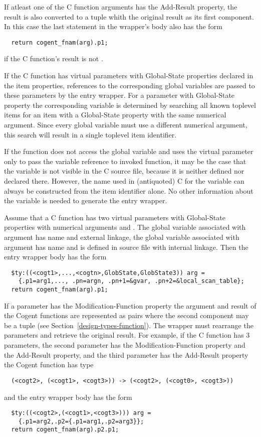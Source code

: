 If atleast one of the C function arguments has the Add-Result property, the result is also converted to a tuple 
whith the original result as its first component. In this case the last statement in the wrapper's body also 
has the form
\begin{verbatim}
  return cogent_fnam(arg).p1;
\end{verbatim}
if the C function's result is not .

If the C function has virtual parameters with Global-State properties declared in the item properties, references
to the corresponding global variables are passed to these parameters by the entry wrapper. For a parameter with 
Global-State property the corresponding variable is determined by searching all known toplevel items for an
item with a Global-State property with the same numerical argument. Since every global variable must use a 
different numerical argument, this search will result in a single toplevel item identifier. 

If the function does not access the global variable and uses the virtual parameter only to pass the variable 
reference to invoked function, it may be the case that the variable is not visible in the C source file, because
it is neither defined nor declared there. However, the name used in (antiquoted) C for the variable can always 
be constructed from the item identifier alone. No other information about the variable is needed to generate the 
entry wrapper.

Assume that a C function has two virtual parameters with Global-State properties with numerical arguments 
 and . The global variable associated with argument  has name  and external linkage,
the global variable associated with argument  has name  and is defined in source file 
with internal linkage. Then the entry wrapper body has the form
\begin{verbatim}
  $ty:((<cogt1>,...,<cogtn>,GlobState,GlobState3)) arg = 
    {.p1=arg1,..., .pn=argn, .pn+1=&gvar, .pn+2=&local_scan_table};
  return cogent_fnam(arg).p1;
\end{verbatim}


If a parameter has the Modification-Function property the argument and result of the Cogent functions are
represented as pairs where the second component may be a tuple (see Section~\ref{design-types-function}). 
The wrapper must rearrange the parameters and retrieve the original result. For example, if the C 
function has 3 parameters, the second parameter has the Modification-Function property and the Add-Result 
property, and the third parameter has the Add-Result property the Cogent function has type
\begin{verbatim}
  (<cogt2>, (<cogt1>, <cogt3>)) -> (<cogt2>, (<cogt0>, <cogt3>))
\end{verbatim}
and the entry wrapper body has the form
\begin{verbatim}
  $ty:((<cogt2>,(<cogt1>,<cogt3>))) arg = 
    {.p1=arg2,.p2={.p1=arg1,.p2=arg3}};
  return cogent_fnam(arg).p2.p1;
\end{verbatim}

